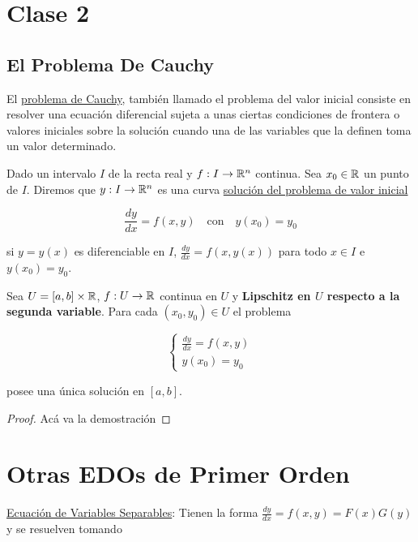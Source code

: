 \section*{Clase 2}

\subsection*{El Problema De Cauchy}

El \ul{problema de Cauchy}, también llamado el problema del valor inicial consiste en resolver una ecuación diferencial sujeta a unas ciertas condiciones de frontera o valores iniciales sobre la solución cuando una de las variables que la definen toma un valor determinado.

\begin{defn}
    Dado un intervalo $I$ de la recta real y $f: I \rightarrow \mathbb{R}^n$ continua. Sea $x_0 \in \mathbb{R}$ un punto de $I$. Diremos que $y: I \rightarrow \mathbb{R}^n$ es una curva \ul{solución del problema de valor inicial}

    \[
    \frac{dy}{dx} = f(x, y) \quad \text{con} \quad y(x_0) = y_0
    \]

    si $y = y(x)$ es diferenciable en $I$, $\frac{dy}{dx} = f(x, y(x))$ para todo $x \in I$ e $y(x_0) = y_0$.
\end{defn}

\begin{teo}
    Sea $U = [ a, b ] \times \mathbb{R}$, $f: U \rightarrow \mathbb{R}$ continua en $U$ y \textbf{Lipschitz en $U$ respecto a la segunda variable}. Para cada $(x_0, y_0) \in U$ el problema

    \[
    \begin{cases*}
    \frac{\displaystyle dy}{\displaystyle dx} = f(x, y) \\
    y(x_0) = y_0    
    \end{cases*}
    \]

    posee una única solución en $[a, b]$.
\end{teo}

\begin{proof}
    Acá va la demostración
\end{proof}

\section*{Otras EDOs de Primer Orden}

\ul{Ecuación de Variables Separables}: Tienen la forma $\frac{dy}{dx} = f(x, y) = F(x)G(y)$ y se resuelven tomando
    
